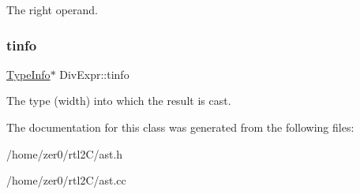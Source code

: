 The right operand. \mbox{\label{class_div_expr_a38c94a688e9ea6e9c7359d6f2df24de6}} 
\subsubsection{\texorpdfstring{tinfo}{tinfo}}
{\footnotesize\ttfamily \hyperlink{class_type_info}{Type\+Info}$\ast$ Div\+Expr\+::tinfo\hspace{0.3cm}{\ttfamily [protected]}}

The type (width) into which the result is cast. 

The documentation for this class was generated from the following files\+:\begin{DoxyCompactItemize}
\item 
/home/zer0/rtl2\+C/ast.\+h\item 
/home/zer0/rtl2\+C/ast.\+cc\end{DoxyCompactItemize}

